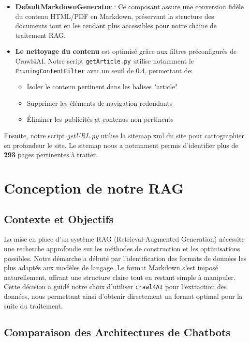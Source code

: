 \documentclass{article}
\begin{document}
\begin{enumerate}
\begin{itemize}
    \item \textbf{DefaultMarkdownGenerator} : Ce composant assure une conversion fidèle du contenu HTML/PDF en Markdown, préservant la structure des documents tout en les rendant plus accessibles pour notre chaîne de traitement RAG.
    
    \item \textbf{Le nettoyage du contenu} est optimisé grâce aux filtres préconfigurés de Crawl4AI. Notre script \texttt{getArticle.py} utilise notamment le \texttt{PruningContentFilter} avec un seuil de 0.4, permettant de:
    \begin{itemize}
        \item Isoler le contenu pertinent dans les balises "article"
        \item Supprimer les éléments de navigation redondants
        \item Éliminer les publicités et contenus non pertinents
    \end{itemize}
\end{itemize}

Ensuite, notre script \textit{getURL.py} utilise la sitemap.xml du site pour cartographier en profondeur le site. Le sitemap nous a notamment permis d'identifier plus de \textbf{293} pages pertinentes à traiter.


\end{enumerate}

\clearpage

\section{Conception de notre RAG}

\subsection{Contexte et Objectifs}
La mise en place d'un système RAG (Retrieval-Augmented Generation) nécessite une recherche approfondie sur les méthodes de construction et les optimisations possibles. Notre démarche a débuté par l'identification des formats de données les plus adaptés aux modèles de langage. Le format Markdown s'est imposé naturellement, offrant une structure claire tout en restant simple à manipuler. Cette décision a guidé notre choix d'utiliser \texttt{crawl4AI} pour l'extraction des données, nous permettant ainsi d'obtenir directement un format optimal pour la suite du traitement.

\subsection{Comparaison des Architectures de Chatbots}
\end{document}
